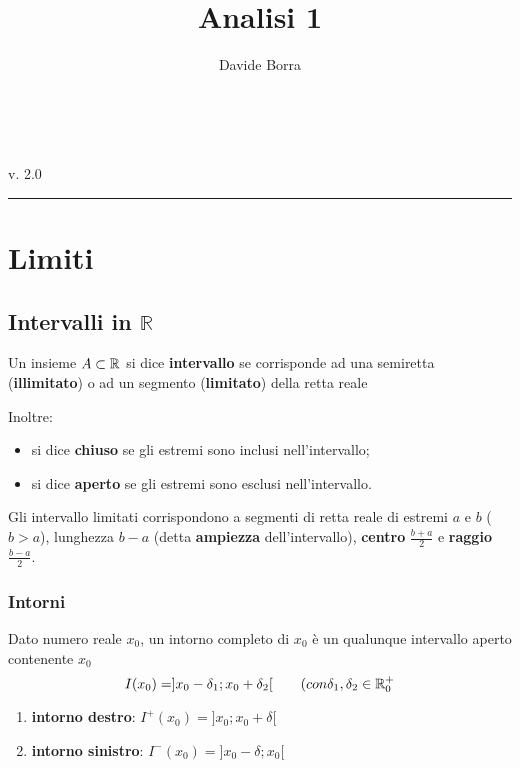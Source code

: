 \documentclass{book}     %
\title{Analisi 1}
\author{Davide Borra}
\date{}
\makeatletter
\let\runauthor\@author
\let\runtitle\@title
\makeatother
\begin{document}
\lhead{}
\chead{}
\rfoot{\runauthor}

\begin{titlepage}
    \pagestyle{empty}
    \begin{center}
        \vspace*{\fill}
        \vspace{0.5cm}
        \textbf{\Huge \runtitle}\\\vspace{5mm}
        \textsc{\Large \runauthor}
        \vspace{5cm}
    \end{center}
    \vspace*{\fill}
    v. 2.0\\
    \rule{0.8\linewidth}{0.5mm}
    \restoregeometry
\end{titlepage}
\thispagestyle{empty}
\frontmatter
    \tableofcontents
    \creativecommons
\mainmatter
{}
\chead{}
\rhead{\leftmark\ - \rightmark}
\rfoot{\runauthor}

\chapter{Limiti}
\section{Intervalli in $\mathbb{R}$}
\begin{boxdef}
    Un insieme $A \subset \mathbb{R}$ si dice \textbf{intervallo} se corrisponde ad una semiretta (\textbf{illimitato}) o ad un segmento (\textbf{limitato}) della retta reale
\end{boxdef}
Inoltre:
\begin{itemize}
    \item si dice \textbf{chiuso} se gli estremi sono inclusi nell'intervallo;
    \item si dice \textbf{aperto} se gli estremi sono esclusi nell'intervallo.
\end{itemize}
Gli intervallo limitati corrispondono a segmenti di retta reale di estremi $a$ e $b$ ($b>a$), lunghezza $b-a$ (detta \textbf{ampiezza} dell'intervallo), \textbf{centro} $\frac{b+a}{2}$ e \textbf{raggio} $\frac{b-a}{2}$.
\subsection{Intorni}
\begin{boxdef}
    Dato numero reale $x_0$, un intorno completo di $x_0$ è un qualunque intervallo aperto contenente $x_0$ \[I(x_0)=]x_0-\delta_1;x_0+\delta_2[ ~~~~~~ (con \delta_1, \delta_2 \in \mathbb{R}_0^+\]
\end{boxdef}
\begin{enumerate}
    \item \textbf{intorno destro}: $I^+(x_0)=]x_0;x_0+\delta[$
    \item \textbf{intorno sinistro}: $I^-(x_0)=]x_0-\delta;x_0[$
\end{enumerate}
\end{document}
